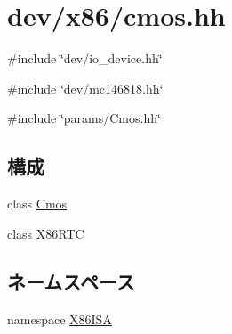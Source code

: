 \hypertarget{cmos_8hh}{
\section{dev/x86/cmos.hh}
\label{cmos_8hh}
}
{\ttfamily \#include \char`\"{}dev/io\_\-device.hh\char`\"{}}\par
{\ttfamily \#include \char`\"{}dev/mc146818.hh\char`\"{}}\par
{\ttfamily \#include \char`\"{}params/Cmos.hh\char`\"{}}\par
\subsection*{構成}
\begin{DoxyCompactItemize}
\item 
class \hyperlink{classX86ISA_1_1Cmos}{Cmos}
\item 
class \hyperlink{classX86ISA_1_1Cmos_1_1X86RTC}{X86RTC}
\end{DoxyCompactItemize}
\subsection*{ネームスペース}
\begin{DoxyCompactItemize}
\item 
namespace \hyperlink{namespaceX86ISA}{X86ISA}
\end{DoxyCompactItemize}
